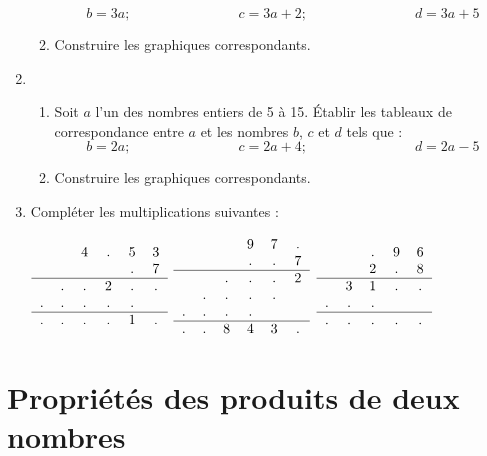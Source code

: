 \documentclass[12 pt]{report}
\theoremstyle{plain}
\newcounter{n}
\begin{document}
\begin{enumerate}
\begin{enumerate}
\[ b= 3 a ; \phantom{meowmeowmeow} c = 3a + 2 ;
\phantom{meowmeowmeow} d = 3a + 5\]
\item Construire les graphiques correspondants. 
\end{enumerate}
\item \begin{enumerate}
\item Soit $a$ l'un des nombres entiers de 5 à 15. 
Établir les tableaux de correspondance entre $a$ et 
les nombres $b$, $c$ et $d$ tels que : 
\[ b= 2 a ; \phantom{meowmeowmeow} c = 2a + 4 ;
\phantom{meowmeowmeow} d = 2a - 5\]
\item Construire les graphiques correspondants. 
\end{enumerate}
\item Compléter les multiplications suivantes : 

  $ \begin{tabular}{cccccc}
   & & 4 & . & 5 & 3 \\
   & &   &   & . & 7  \\
   \hline 
   & . & . & 2 & . & . \\
   . & . &. &. & . &\\
   \hline 
   . &. &. &. & 1 &. 
  \end{tabular}
 $\phantom{meowmeow}
   $ \begin{tabular}{cccccc}
   & & & 9 & 7 & .\\
   & & & . & . &  7 \\
   \hline
   & & . & . &. & 2 \\
   & . & . & . & . & \\
   . & . & . & . & & \\
   \hline 
   . & . & 8 & 4 & 3 & . 
  \end{tabular}
 $
   $ \begin{tabular}{ccccc}
   & & . & 9 & 6 \\ 
   & & 2 & . & 8 \\
   \hline 
   & 3 & 1 & . & . \\
   . & . & . & & \\ 
   \hline 
   . & . & . & . &.
  \end{tabular}
 $

 \end{enumerate}
 
 \chapter{Propriétés des produits de deux nombres}
 
\end{document}
